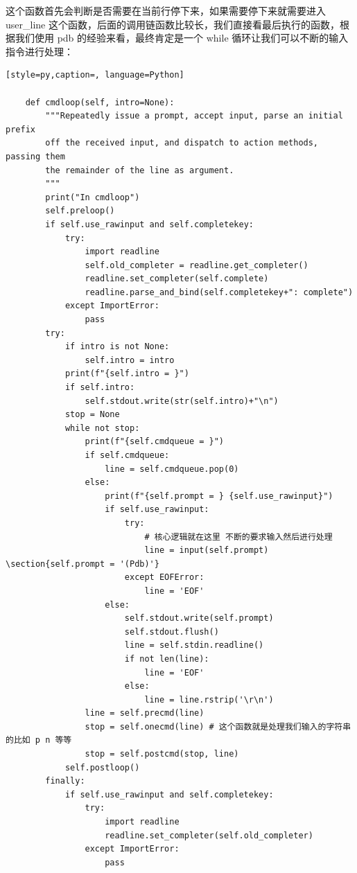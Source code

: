 这个函数首先会判断是否需要在当前行停下来，如果需要停下来就需要进入 user\_line 这个函数，后面的调用链函数比较长，我们直接看最后执行的函数，根据我们使用 pdb 的经验来看，最终肯定是一个 while 循环让我们可以不断的输入指令进行处理：
\begin{lstlisting}[style=py,caption=, language=Python]

    def cmdloop(self, intro=None):
        """Repeatedly issue a prompt, accept input, parse an initial prefix
        off the received input, and dispatch to action methods, passing them
        the remainder of the line as argument.
        """
        print("In cmdloop")
        self.preloop()
        if self.use_rawinput and self.completekey:
            try:
                import readline
                self.old_completer = readline.get_completer()
                readline.set_completer(self.complete)
                readline.parse_and_bind(self.completekey+": complete")
            except ImportError:
                pass
        try:
            if intro is not None:
                self.intro = intro
            print(f"{self.intro = }")
            if self.intro:
                self.stdout.write(str(self.intro)+"\n")
            stop = None
            while not stop:
                print(f"{self.cmdqueue = }")
                if self.cmdqueue:
                    line = self.cmdqueue.pop(0)
                else:
                    print(f"{self.prompt = } {self.use_rawinput}")
                    if self.use_rawinput:
                        try:
                            # 核心逻辑就在这里 不断的要求输入然后进行处理
                            line = input(self.prompt) \section{self.prompt = '(Pdb)'}
                        except EOFError:
                            line = 'EOF'
                    else:
                        self.stdout.write(self.prompt)
                        self.stdout.flush()
                        line = self.stdin.readline()
                        if not len(line):
                            line = 'EOF'
                        else:
                            line = line.rstrip('\r\n')
                line = self.precmd(line)
                stop = self.onecmd(line) # 这个函数就是处理我们输入的字符串的比如 p n 等等
                stop = self.postcmd(stop, line)
            self.postloop()
        finally:
            if self.use_rawinput and self.completekey:
                try:
                    import readline
                    readline.set_completer(self.old_completer)
                except ImportError:
                    pass
\end{lstlisting}
